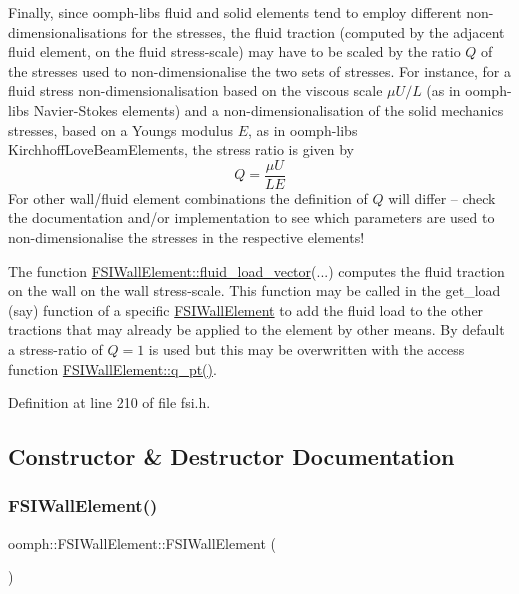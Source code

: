 Finally, since oomph-\/lib\textquotesingle{}s fluid and solid elements tend to employ different non-\/dimensionalisations for the stresses, the fluid traction (computed by the adjacent fluid element, on the fluid stress-\/scale) may have to be scaled by the ratio $ Q $ of the stresses used to non-\/dimensionalise the two sets of stresses. For instance, for a fluid stress non-\/dimensionalisation based on the viscous scale $ \mu U / L$ (as in oomph-\/lib\textquotesingle{}s Navier-\/\+Stokes elements) and a non-\/dimensionalisation of the solid mechanics stresses, based on a Young\textquotesingle{}s modulus $ E $, as in oomph-\/lib\textquotesingle{}s Kirchhoff\+Love\+Beam\+Elements, the stress ratio is given by \[ Q=\frac{\mu U}{LE} \] For other wall/fluid element combinations the definition of $ Q $ will differ -- check the documentation and/or implementation to see which parameters are used to non-\/dimensionalise the stresses in the respective elements!

The function \hyperlink{classoomph_1_1FSIWallElement_a4b6eacec41f41006a3884ee0dbda3bcb}{F\+S\+I\+Wall\+Element\+::fluid\+\_\+load\+\_\+vector}(...) computes the fluid traction on the wall on the wall stress-\/scale. This function may be called in the get\+\_\+load (say) function of a specific \hyperlink{classoomph_1_1FSIWallElement}{F\+S\+I\+Wall\+Element} to add the fluid load to the other tractions that may already be applied to the element by other means. By default a stress-\/ratio of $ Q = 1 $ is used but this may be overwritten with the access function \hyperlink{classoomph_1_1FSIWallElement_ab407513775b5250b016ab91fa98dc1a0}{F\+S\+I\+Wall\+Element\+::q\+\_\+pt()}. 

Definition at line 210 of file fsi.\+h.



\subsection{Constructor \& Destructor Documentation}
\mbox{\label{classoomph_1_1FSIWallElement_ae27388763fb781afa1d620fad111f234}} 
\subsubsection{\texorpdfstring{F\+S\+I\+Wall\+Element()}{FSIWallElement()}\hspace{0.1cm}{\footnotesize\ttfamily [1/2]}}
{\footnotesize\ttfamily oomph\+::\+F\+S\+I\+Wall\+Element\+::\+F\+S\+I\+Wall\+Element (\begin{DoxyParamCaption}{ }\end{DoxyParamCaption})\hspace{0.3cm}{\ttfamily [inline]}}



